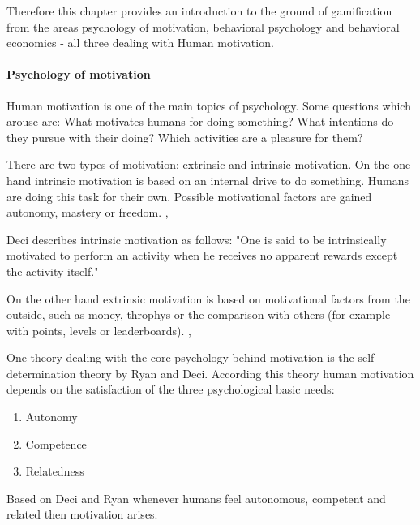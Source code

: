 Therefore this chapter provides an introduction to the ground of gamification from the areas psychology of motivation, behavioral psychology and behavioral economics - all three dealing with Human motivation.

\paragraph*{Psychology of motivation}
Human motivation is one of the main topics of psychology. Some questions which arouse are: What motivates humans for doing something? What intentions do they pursue with their doing? Which activities are a pleasure for them? \cite[p. 1]{bierhoffeditorEnzyklopaediePsychologieSoziale2016}

There are two types of motivation: extrinsic and intrinsic motivation. 
On the one hand intrinsic motivation is based on an internal drive to do something. Humans are doing this task for their own. Possible motivational factors are gained autonomy, mastery or freedom. \cite[p. 2, 3, 4]{bierhoffeditorEnzyklopaediePsychologieSoziale2016}, \cite[p. 60, 61]{kumarGamificationWorkDesigning2013}

Deci describes intrinsic motivation as follows: "One is said to be intrinsically motivated to perform an activity when he receives no apparent rewards except the activity itself." \cite[p. 105]{deciEffectsExternallyMediated1971}

On the other hand extrinsic motivation is based on motivational factors from the outside, such as money, throphys or the comparison with others (for example with points, levels or leaderboards). \cite[p. 2, 3, 4]{bierhoffeditorEnzyklopaediePsychologieSoziale2016}, \cite[p. 60, 61]{kumarGamificationWorkDesigning2013}

\label{selfDeterminationTheory}
One theory dealing with the core psychology behind motivation is the self-determination theory by Ryan and Deci. According this theory human motivation depends on the satisfaction of the three psychological basic needs: 
\begin{enumerate}
	\item Autonomy
	\item Competence
	\item Relatedness
\end{enumerate} 
Based on Deci and Ryan whenever humans feel autonomous, competent and related then motivation arises. \cite[p. 416-432]{deciTheoriesSocialPsychology2019}

